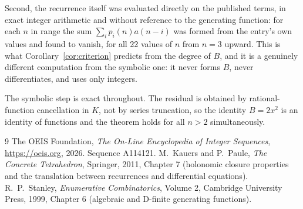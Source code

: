 \documentclass[11pt,a4paper]{article}
\theoremstyle{plain}
\theoremstyle{definition}
\begin{document}
Second, the recurrence itself was evaluated directly on the published terms, in exact
integer arithmetic and without reference to the generating function: for each $n$ in range
the sum $\sum_{i}p_{i}(n)a(n-i)$ was formed from the entry's own values and found to
vanish, for all 22 values of $n$ from $n=3$ upward. This is what
Corollary~\ref{cor:criterion} predicts from the degree of $B$, and it is a genuinely
different computation from the symbolic one: it never forms $B$, never differentiates, and
uses only integers.

The symbolic step is exact throughout. The residual is obtained by rational-function
cancellation in $K$, not by series truncation, so the identity $B=2 x^{2}$ is an
identity of functions and the theorem holds for all $n>2$ simultaneously.

\begin{thebibliography}{9}
 The OEIS Foundation, \emph{The On-Line Encyclopedia of Integer Sequences},
\url{https://oeis.org}, 2026. Sequence A114121.
 M.~Kauers and P.~Paule, \emph{The Concrete Tetrahedron}, Springer, 2011,
Chapter 7 (holonomic closure properties and the translation between recurrences and
differential equations).
 R.~P.~Stanley, \emph{Enumerative Combinatorics}, Volume 2, Cambridge
University Press, 1999, Chapter 6 (algebraic and D-finite generating functions).
\end{thebibliography}
\end{document}
